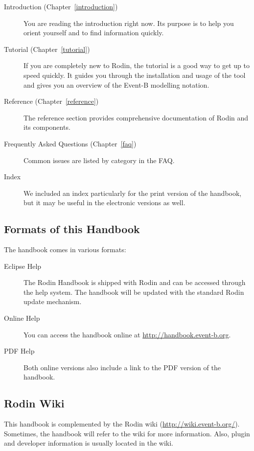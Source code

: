 \documentclass[twoside,10pt]{book}
\begin{document}
\begin{description}
	\item[Introduction (Chapter~\ref{introduction})] You are reading the introduction right now.  Its purpose is to help you orient yourself and to find information quickly.
	\item[Tutorial (Chapter~\ref{tutorial})] If you are completely new to Rodin, the tutorial is a good way to get up to speed quickly.  It guides you through the installation and usage of the tool and gives you an overview of the Event-B modelling notation.
	\item[Reference (Chapter~\ref{reference})] The reference section provides comprehensive documentation of Rodin and its components.
	\item[Frequently Asked Questions  (Chapter~\ref{faq})] Common issues are listed by category in the FAQ.
	\item[Index] We included an index particularly for the print version of the handbook, but it may be useful in the electronic versions as well.  
\end{description}

\subsection{Formats of this Handbook}
\label{handbook_formats}

The handbook comes in various formats:

\begin{description}
	\item[Eclipse Help] The Rodin Handbook is shipped with Rodin and can be accessed through the help system.  The handbook will be updated with the standard Rodin update mechanism.
	\item[Online Help] You can access the handbook online at \url{http://handbook.event-b.org}.
	\item[PDF Help] Both online versions also include a link to the PDF version of the handbook.
\end{description}

\subsection{Rodin Wiki}
\label{rodin_wiki}

This handbook is complemented by the Rodin wiki (\url{http://wiki.event-b.org/}).  Sometimes, the handbook will refer to the wiki for more information.  Also, plugin and developer information is usually located in the wiki.
\end{document}
